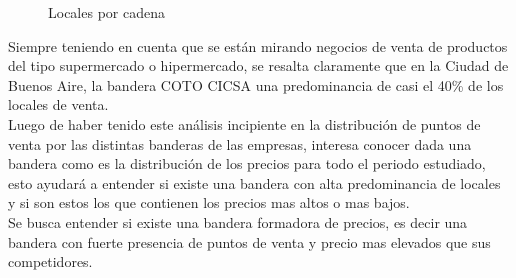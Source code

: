 \begin{figure}[h]
\centering
{}%
\caption{Locales por cadena}
\label{Locales_x_cadena}
\end{figure}





Siempre teniendo en cuenta que se están mirando negocios de venta de productos del tipo supermercado o hipermercado, se resalta claramente que en la Ciudad de Buenos Aire, la bandera COTO CICSA una predominancia de casi el 40\% de los locales de venta.\\

Luego de haber tenido este análisis incipiente en la distribución de puntos de venta por las distintas banderas de las empresas, interesa conocer dada una bandera como es la distribución de los precios para todo el periodo estudiado, esto ayudará a entender si existe una bandera con alta predominancia de locales y si son estos los que contienen los precios mas altos o mas bajos.\\
Se busca entender si existe una bandera formadora de precios, es decir una bandera con fuerte presencia de puntos de venta y precio mas elevados que sus competidores.\\




